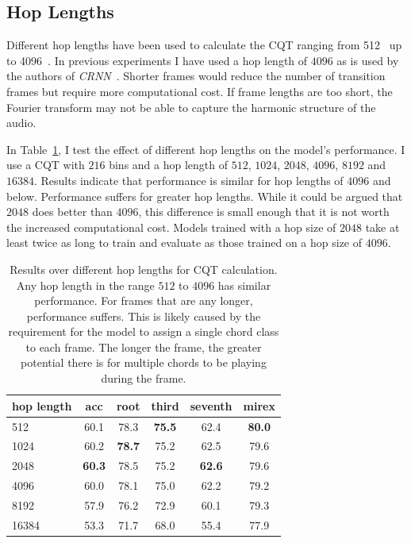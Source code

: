 \subsection{Hop Lengths}\label{sec:hop-lengths}

Different hop lengths have been used to calculate the CQT ranging from 512~\cite{ACRLargeVocab1} up to 4096~\citep{StructuredTraining}. In previous experiments I have used a hop length of $4096$ as is used by the authors of \emph{CRNN}~\citep{StructuredTraining}. Shorter frames would reduce the number of transition frames but require more computational cost. If frame lengths are too short, the Fourier transform may not be able to capture the harmonic structure of the audio.

In Table~\ref{tab:hop_lengths}, I test the effect of different hop lengths on the model's performance. I use a CQT with $216$ bins and a hop length of $512$, $1024$, $2048$, $4096$, $8192$ and $16384$. Results indicate that performance is similar for hop lengths of $4096$ and below. Performance suffers for greater hop lengths. While it could be argued that $2048$ does better than $4096$, this difference is small enough that it is not worth the increased computational cost. Models trained with a hop size of $2048$ take at least twice as long to train and evaluate as those trained on a hop size of $4096$.

\begin{table}[h]
    \centering
    \begin{tabular}{lccccc}
        \toprule
        hop length & acc & root & third & seventh & mirex \\  
        \midrule
        512 & 60.1 & 78.3 & \textbf{75.5} & 62.4 & \textbf{80.0} \\
        1024 & 60.2 & \textbf{78.7} & 75.2 & 62.5 & 79.6 \\
        2048 & \textbf{60.3} & 78.5 & 75.2 & \textbf{62.6} & 79.6 \\
        4096 & 60.0 & 78.1 & 75.0 & 62.2 & 79.2 \\
        8192 & 57.9 & 76.2 & 72.9 & 60.1 & 79.3 \\
        16384 & 53.3 & 71.7 & 68.0 & 55.4 & 77.9 \\
        \bottomrule
    \end{tabular}
    \caption{Results over different hop lengths for CQT calculation. Any hop length in the range $512$ to $4096$ has similar performance. For frames that are any longer, performance suffers. This is likely caused by the requirement for the model to assign a single chord class to each frame. The longer the frame, the greater potential there is for multiple chords to be playing during the frame. }\label{tab:hop_lengths}
\end{table}


